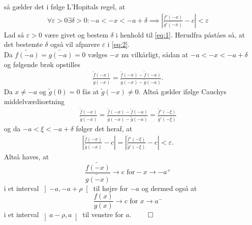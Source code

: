 \documentclass[12pt]{article}
\begin{document}
så gælder det i følge L'Hopitals regel, at
\begin{align}
\forall \varepsilon > 0 \exists \delta > 0 : -a < -x < -a + \delta \implies \left| \frac{\tilde{f}'(-x)}{\tilde{g}'(-x)}-c \right| < \varepsilon \label{eq:2}
\end{align}
Lad så $\varepsilon > 0$ være givet og bestem $\delta$ i henhold til \eqref{eq:1}. Herudfra påståes så, at det bestemte $\delta$ også vil afparere $\varepsilon$ i \eqref{eq:2}. \\
Da $\tilde{f(-a)}=\tilde{g(-a)}=0$ vælges $-x$ nu vilkårligt, sådan at $-a<-x<-a+\delta$ og følgende brøk opstilles
\begin{align}
\frac{\tilde{f}(-x)}{\tilde{g}(-x)} = \frac{\tilde{f}(-x)-\tilde{f}(-a)}{\tilde{g}(-x)-\tilde{g}(-a)}. \label{eq:4}
\end{align}
Da $x\neq -a$ og $\tilde{g}(0)=0$ fås at $\tilde{g}(-x)\neq 0$. Altså gælder ifølge Cauchys middelværdisætning
\begin{align}
\frac{\tilde{f}(-x)}{\tilde{g}(-x)} = \frac{\tilde{f}(-x)-\tilde{f}(-a)}{\tilde{g}(-x)-\tilde{g}(-a)}=\frac{\tilde{f}'(-\xi)}{\tilde{g}'(-\xi)}
\end{align} 	
og da $-a<\xi<-a+\delta$ følger det heraf, at 
\begin{align}
\left|\frac{\tilde{f}(-x)}{\tilde{g}(-x)}-c\right| = \left|\frac{\tilde{f}'(-\xi)}{\tilde{g}'(-\xi)}-c\right| < \varepsilon.
\end{align}
Altså haves, at
\begin{equation}
\frac{\tilde{f(-x)}}{\tilde{g(-x)}}\to c \text{ for} -x\to -a^+
\end{equation}
i et interval $\left]-a,-a+\rho\right[$ til højre for $-a$ og dermed også at
\begin{equation}
\frac{f(x)}{g(x)}\to c \text{ for } x\to a^-
\end{equation}
i et interval $\left]a-\rho,a\right[$ til venstre for $a$.
\hfill$\qed$
\\
\end{document}
